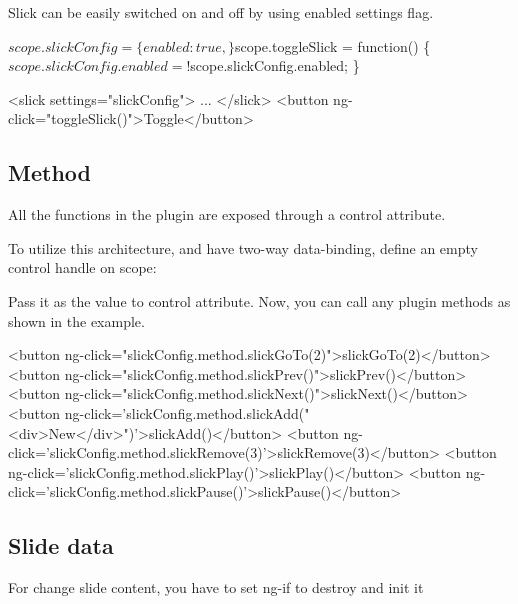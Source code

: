 Slick can be easily switched on and off by using {\ttfamily enabled} settings flag. 
\begin{DoxyCode}
$scope.slickConfig = \{
    enabled: true,
\}
$scope.toggleSlick = function() \{
  $scope.slickConfig.enabled = !$scope.slickConfig.enabled;
\}
\end{DoxyCode}
 
\begin{DoxyCode}
<slick settings="slickConfig">
 ...
</slick>
<button ng-click="toggleSlick()">Toggle</button>
\end{DoxyCode}


\subsection*{Method}


\begin{DoxyEnumerate}
\item All the functions in the plugin are exposed through a control attribute.
\item To utilize this architecture, and have two-\/way data-\/binding, define an empty control handle on scope\+: 

\item Pass it as the value to control attribute. Now, you can call any plugin methods as shown in the example.
\end{DoxyEnumerate}


\begin{DoxyCode}
<button ng-click="slickConfig.method.slickGoTo(2)">slickGoTo(2)</button>
<button ng-click="slickConfig.method.slickPrev()">slickPrev()</button>
<button ng-click="slickConfig.method.slickNext()">slickNext()</button>
<button ng-click='slickConfig.method.slickAdd("<div>New</div>")'>slickAdd()</button>
<button ng-click='slickConfig.method.slickRemove(3)'>slickRemove(3)</button>
<button ng-click='slickConfig.method.slickPlay()'>slickPlay()</button>
<button ng-click='slickConfig.method.slickPause()'>slickPause()</button>
\end{DoxyCode}


\subsection*{Slide data}

For change slide content, you have to set {\ttfamily ng-\/if} to destroy and init it


